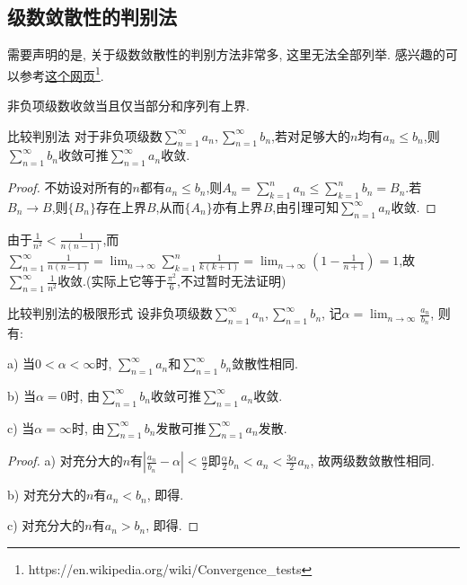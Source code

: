 \subsection{级数敛散性的判别法}

需要声明的是, 关于级数敛散性的判别方法非常多, 这里无法全部列举. 感兴趣的可以参考\href{https://en.wikipedia.org/wiki/Convergence_tests}{这个网页}\footnote{https://en.wikipedia.org/wiki/Convergence\_tests}. 

\begin{lemma}{}
	非负项级数收敛当且仅当部分和序列有上界.
\end{lemma}

\begin{proposition}{比较判别法}
	对于非负项级数$\sum_{n=1}^{\infty} a_n,\sum_{n=1}^{\infty} b_n$,若对足够大的$n$均有$a_n \leq b_n$,则$\sum_{n=1}^{\infty} b_n$收敛可推$\sum_{n=1}^{\infty} a_n$收敛.
\end{proposition}
\begin{proof}
	不妨设对所有的$n$都有$a_n \leq b_n$,则$A_n = \sum_{k=1}^{n} a_n \leq \sum_{k=1}^n b_n = B_n$.若$B_n \to B$,则$\{ B_n \}$存在上界$B$,从而$\{ A_n \}$亦有上界$B$,由引理可知$\sum_{n=1}^{\infty} a_n$收敛.
\end{proof}

\begin{example}
	由于$\frac{1}{n^2}<\frac{1}{n(n-1)}$,而$\sum_{n=1}^{\infty}\frac{1}{n(n-1)} = \lim_{n\to \infty} \sum_{k=1}^{n} \frac{1}{k(k+1)} = \lim_{n\to \infty} (1-\frac{1}{n+1})=1$,故$\sum_{n=1}^{\infty} \frac{1}{n^2}$收敛.(实际上它等于$\frac{\pi ^2}{6}$,不过暂时无法证明)
\end{example}

\begin{corollary}{比较判别法的极限形式}
	设非负项级数$\sum_{n=1}^{\infty} a_n,\sum_{n=1}^{\infty} b_n$, 记$\alpha=\lim_{n\to \infty} \frac{a_n}{b_n}$, 则有: 
	
	a) 当$0<\alpha <\infty$时, $\sum_{n=1}^{\infty} a_n$和$\sum_{n=1}^{\infty} b_n$敛散性相同. 
	
	b) 当$\alpha =0$时, 由$\sum_{n=1}^{\infty} b_n$收敛可推$\sum_{n=1}^{\infty} a_n$收敛. 
	
	c) 当$\alpha = \infty$时, 由$\sum_{n=1}^{\infty} b_n$发散可推$\sum_{n=1}^{\infty} a_n$发散. 
\end{corollary}
\begin{proof}
	a) 对充分大的$n$有$|\frac{a_n}{b_n}-\alpha |<\frac{\alpha}{2}$即$\frac{\alpha}{2} b_n<a_n<\frac{3\alpha}{2}a_n$, 故两级数敛散性相同. 
	
	b) 对充分大的$n$有$a_n<b_n$, 即得. 
	
	c) 对充分大的$n$有$a_n>b_n$, 即得. 
\end{proof}

